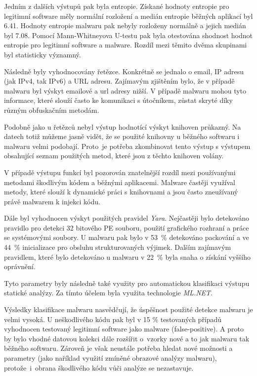 Jedním z dalších výstupů pak byla entropie. Získané hodnoty entropie pro legitimní software měly normální rozložení a medián entropie běžných aplikací byl 6.41. Hodnoty entropie malwaru pak nebyly rozloženy normálně a jejich medián byl 7.08. Pomocí Mann-Whitneyova U-testu pak byla otestována shodnost hodnot entropie pro legitimní software a malware. Rozdíl mezi těmito dvěma skupinami byl statisticky významný.

Následně byly vyhodnocovány řetězce. Konkrétně se jednalo o email, IP adresu (jak IPv4, tak IPv6) a URL adresu. Zajímavým zjištěním bylo, že v případě malwaru byl výskyt emailové a url adresy nižší. V případě malwaru mohou tyto informace, které slouží často ke komunikaci s útočníkem, zůstat skryté díky různým obfuskačním metodám.

Podobně jako u řetězců nebyl výstup hodnotící výskyt knihoven průkazný. Na datech totiž můžeme jasně vidět, že se použité knihovny u běžného softwaru i malwaru velmi podobají. Proto~je potřeba zkombinovat tento výstup s výstupem obsahující seznam použitých metod, které jsou z těchto knihoven volány.

V případě výstupu funkcí byl pozorován znatelnější rozdíl mezi používanými metodami škodlivým kódem a běžnými aplikacemi. Malware častěji využíval metody, které slouží k dynamické práci s knihovnami a jsou často zneužívaný právě malwarem k injekci kódu.

Dále byl vyhodnocen výskyt použitých pravidel \emph{Yara}. Nejčastěji bylo detekováno pravidlo pro detekci 32 bitového PE souboru, použití grafického rozhraní a práce se systémovými soubory. U malwaru pak bylo v 53~\% detekováno packování a ve 44~\% inicializace pro obsluhu strukturovaných výjimek. Dalším zajímavým pravidlem, které bylo detekováno u malwaru v 22~\% byla snaha o získání vyššího oprávnění.

Tyto parametry byly následně také využity pro automatickou klasifikaci výstupu statické analýzy. Za tímto účelem byla využita technologie \emph{ML.NET}. 

Výsledky klasifikace malwaru nasvědčují, že úspěšnost použité detekce malwaru je velmi vysoká. U neškodlivého kódu pak byl v 15 \% testovaných  případů vyhodnocen testovaný legitimní software jako malware (false-positive). A proto by bylo vhodné datovou kolekci dále rozšířit o~vzorky nové a to jak malwaru tak běžného softwaru. Zároveň je však neustále potřeba hledat nové možnosti a parametry (jako naříklad využití zmíněné obrazové analýzy malwaru), protože~i~obrana škodlivého kódu vůči analýze se nezastavuje.

